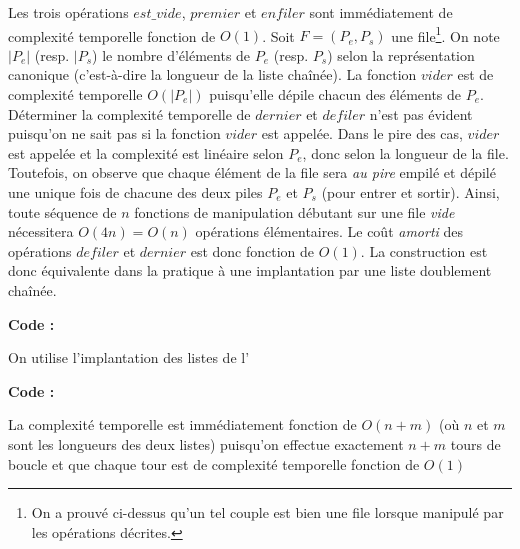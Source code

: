 \documentclass[../main.tex]{subfiles}
\begin{document}
Les trois opérations $est\_vide$, $premier$ et $enfiler$ sont immédiatement de complexité temporelle fonction de $O(1)$. Soit $F = (P_e, P_s)$ une file\footnote{On a prouvé ci-dessus qu'un tel couple est bien une file lorsque manipulé par les opérations décrites.}. On note $|P_e|$ (resp. $|P_s$) le nombre d'éléments de $P_e$ (resp. $P_s$) selon la représentation canonique (c'est-à-dire la longueur de la liste chaînée). La fonction $vider$ est de complexité temporelle $O(|P_e|)$ puisqu'elle dépile chacun des éléments de $P_e$. Déterminer la complexité temporelle de $dernier$ et $defiler$ n'est pas évident puisqu'on ne sait pas si la fonction $vider$ est appelée. Dans le pire des cas, $vider$ est appelée et la complexité est linéaire selon $P_e$, donc selon la longueur de la file. Toutefois, on observe que chaque élément de la file sera \textit{au pire} empilé et dépilé une unique fois de chacune des deux piles $P_e$ et $P_s$ (pour entrer et sortir). Ainsi, toute séquence de $n$ fonctions de manipulation débutant sur une file \textit{vide} nécessitera $O(4n) = O(n)$ opérations élémentaires. Le coût \textit{amorti} des opérations $defiler$ et $dernier$ est donc fonction de $O(1)$. La construction est donc équivalente dans la pratique à une implantation par une liste doublement chaînée.


\textbf{Code :} 


On utilise l'implantation des listes de l'

\textbf{Code :} 

La complexité temporelle est immédiatement fonction de $O(n + m)$ (où $n$ et $m$ sont les longueurs des deux listes) puisqu'on effectue exactement $n + m$ tours de boucle et que chaque tour est de complexité temporelle fonction de $O(1)$
\end{document}
